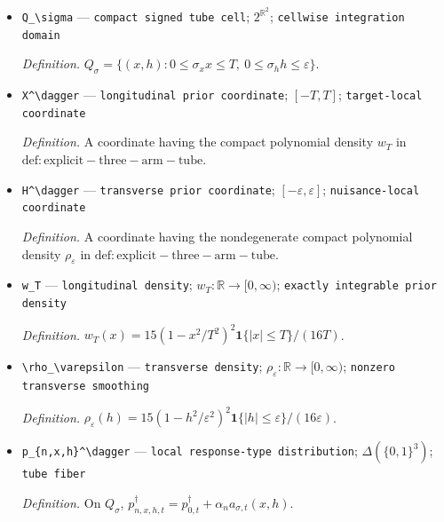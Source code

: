 \documentclass{article}
\begin{document}
\begin{itemize}
  \par\smallskip\noindent\emph{Definition.} \(a_{\sigma,t}(x,h)=|x|\lambda_{v,t}^{\sigma_x}+|h|\lambda_{d,t}^{\sigma_h}-(3|x|+2|h|)p_{0,t}^\dagger\).
  \item \texttt{Q\_\allowbreak{}\textbackslash{}\allowbreak{}sigma} --- \texttt{compact signed tube cell}; \(2^{\mathbb R^2}\); \texttt{cellwise integration domain}
  \par\smallskip\noindent\emph{Definition.} \(Q_\sigma=\{(x,h):0\le\sigma_xx\le T,\ 0\le\sigma_hh\le\varepsilon\}\).
  \item \texttt{X\textasciicircum{}\textbackslash{}\allowbreak{}dagger} --- \texttt{longitudinal prior coordinate}; \([-T,T]\); \texttt{target-\allowbreak{}local coordinate}
  \par\smallskip\noindent\emph{Definition.} A coordinate having the compact polynomial density \(w_T\) in \(\mathrm{def:explicit-three-arm-tube}\).
  \item \texttt{H\textasciicircum{}\textbackslash{}\allowbreak{}dagger} --- \texttt{transverse prior coordinate}; \([-\varepsilon,\varepsilon]\); \texttt{nuisance-\allowbreak{}local coordinate}
  \par\smallskip\noindent\emph{Definition.} A coordinate having the nondegenerate compact polynomial density \(\rho_\varepsilon\) in \(\mathrm{def:explicit-three-arm-tube}\).
  \item \texttt{w\_\allowbreak{}T} --- \texttt{longitudinal density}; \(w_T:\mathbb R\to[0,\infty)\); \texttt{exactly integrable prior density}
  \par\smallskip\noindent\emph{Definition.} \(w_T(x)=15(1-x^2/T^2)^2\mathbf 1\{|x|\le T\}/(16T)\).
  \item \texttt{\textbackslash{}\allowbreak{}rho\_\allowbreak{}\textbackslash{}\allowbreak{}varepsilon} --- \texttt{transverse density}; \(\rho_\varepsilon:\mathbb R\to[0,\infty)\); \texttt{nonzero transverse smoothing}
  \par\smallskip\noindent\emph{Definition.} \(\rho_\varepsilon(h)=15(1-h^2/\varepsilon^2)^2\mathbf 1\{|h|\le\varepsilon\}/(16\varepsilon)\).
  \item \texttt{p\_\allowbreak{}\{n,\allowbreak{}x,\allowbreak{}h\}\allowbreak{}\textasciicircum{}\textbackslash{}\allowbreak{}dagger} --- \texttt{local response-\allowbreak{}type distribution}; \(\Delta(\{0,1\}^3)\); \texttt{tube fiber}
  \par\smallskip\noindent\emph{Definition.} On \(Q_\sigma\), \(p_{n,x,h,t}^\dagger=p_{0,t}^\dagger+\alpha_na_{\sigma,t}(x,h)\).

\end{itemize}
\end{document}
